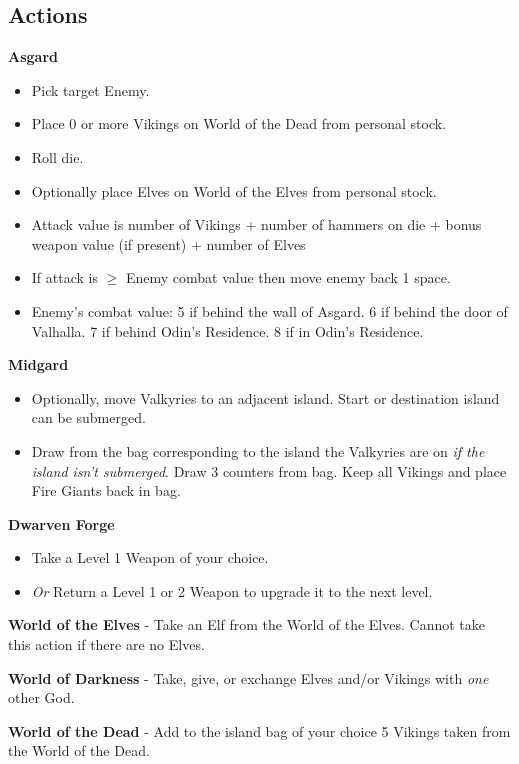 \documentclass[12pt]{article}
\newenvironment{itemizeCustom}
{\begin{itemize}
  \setlength{\itemsep}{1pt}
  \setlength{\parskip}{0pt}
  \setlength{\parsep}{0pt}}
{\end{itemize}}
\begin{document}
\begin{multicols*}{2}
\section*{Actions}
\textbf{Asgard}
\begin{itemizeCustom}
	\item Pick target Enemy.
	\item Place 0 or more Vikings on World of the Dead from personal stock.
	\item Roll die.
	\item Optionally place Elves on World of the Elves from personal stock.
	\item Attack value is number of Vikings + number of hammers on die + bonus weapon value (if present) + number of Elves
	\item If attack is $\ge$ Enemy combat value then move enemy back 1 space.
	\item Enemy's combat value: 5 if behind the wall of Asgard. 6 if behind the door of Valhalla. 7 if behind Odin's Residence. 8 if in Odin's Residence.
\end{itemizeCustom}

\noindent
\textbf{Midgard}
\begin{itemizeCustom}
	\item Optionally, move Valkyries to an adjacent island. Start or destination island can be submerged.
	\item Draw from the bag corresponding to the island the Valkyries are on \emph{if the island isn't submerged}. Draw 3 counters from bag. Keep all Vikings and place Fire Giants back in bag.
\end{itemizeCustom}

\noindent
\textbf{Dwarven Forge}
\begin{itemizeCustom}
	\item Take a Level 1 Weapon of your choice.
	\item \emph{Or} Return a Level 1 or 2 Weapon to upgrade it to the next level.
\end{itemizeCustom}

\noindent
\textbf{World of the Elves} - Take an Elf from the World of the Elves. Cannot take this action if there are no Elves.

\noindent
\textbf{World of Darkness} - Take, give, or exchange Elves and/or Vikings with \emph{one} other God.

\noindent
\textbf{World of the Dead} - Add to the island bag of your choice 5 Vikings taken from the World of the Dead.


\end{multicols*}
\end{document}
